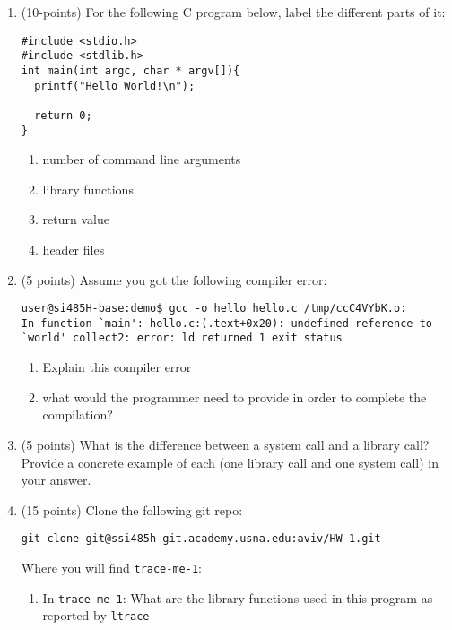 \documentclass{article}[9pt]
\begin{document}
\begin{enumerate}
\item (10-points) For the following C program below, label the different parts of it:
\begin{verbatim}
#include <stdio.h>
#include <stdlib.h>
int main(int argc, char * argv[]){
  printf("Hello World!\n");

  return 0;
}
\end{verbatim}
\begin{enumerate}
\item number of command line arguments

\item library functions

\item return value

\item header files
\end{enumerate}

\item (5 points) Assume you got the following compiler error:
\begin{verbatim}
user@si485H-base:demo$ gcc -o hello hello.c /tmp/ccC4VYbK.o:
In function `main': hello.c:(.text+0x20): undefined reference to `world' collect2: error: ld returned 1 exit status
\end{verbatim}

\begin{enumerate}
\item Explain this compiler error

\item what would the programmer need to provide in order to complete the compilation?
\end{enumerate}

\item (5 points) What is the difference between a system call and a library call?
Provide a concrete example of each (one library call and one
system call) in your answer.

\item (15 points) Clone the following git repo:
\begin{verbatim}
git clone git@ssi485h-git.academy.usna.edu:aviv/HW-1.git
\end{verbatim}
Where you will find \texttt{trace-me-1}:

\begin{enumerate}
\item In \texttt{trace-me-1}: What are the library functions used in this program as reported by \texttt{ltrace}


\end{enumerate}
\end{enumerate}
\end{document}
